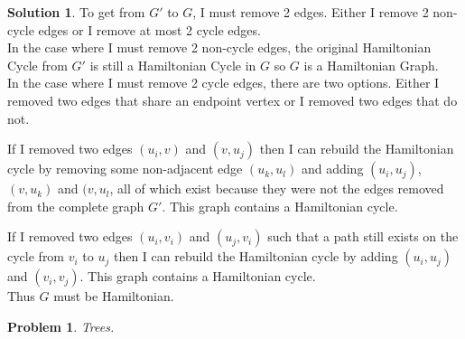 \documentclass{article}
\newtheorem{problem}{Problem}
\theoremstyle{definition}
\newtheorem*{solution}{Solution}
\begin{document}
\begin{solution}
To get from \(G'\) to \(G\), I must remove 2 edges. Either I remove 2 non-cycle edges or I remove at most 2 cycle edges.\\

In the case where I must remove 2 non-cycle edges, the original Hamiltonian Cycle from \(G'\) is still a Hamiltonian Cycle in \(G\) so \(G\) is a Hamiltonian Graph.\\

In the case where I must remove 2 cycle edges, there are two options. Either I removed two edges that share an endpoint vertex or I removed two edges that do not. 

If I removed two edges \((u_i,v)\) and \((v,u_j)\) then I can rebuild the Hamiltonian cycle by removing some non-adjacent edge \((u_k,u_l)\) and adding \((u_i,u_j)\), \((v,u_k)\) and \((v,u_l\), all of which exist because they were not the edges removed from the complete graph \(G'\). This graph contains a Hamiltonian cycle.

If I removed two edges \((u_i,v_i)\) and \((u_j,v_i)\) such that a path still exists on the cycle from \(v_i\) to \(u_j\) then I can rebuild the Hamiltonian cycle by adding \((u_i,u_j)\) and \((v_i,v_j)\). This graph contains a Hamiltonian cycle. \\

Thus \(G\) must be Hamiltonian.

\end{solution}

\begin{problem} 

Trees.

\end{problem}
\end{document}
